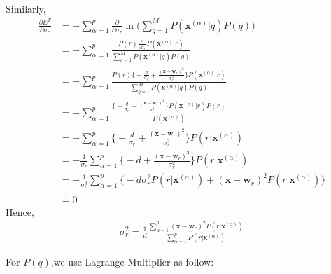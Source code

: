 Similarly,
\begin{align*}
 	\frac{\partial E^T }{\partial \sigma_r} &= - \sum_{\alpha=1}^{p} \frac{\partial }{\partial \sigma_r}  \ln \bigg( \sum_{q=1}^{M} P( \boldsymbol{x}^{(\alpha)} |q) P(q) \bigg) \\
 	&= - \sum_{\alpha=1}^{p} \frac{ P(r)   \frac{\partial }{\partial \sigma_r}  P( \boldsymbol{x}^{(\alpha)} |r)  }{ \sum_{q=1}^{M} P( \boldsymbol{x}^{(\alpha)} |q) P(q) } \\
 	&= - \sum_{\alpha=1}^{p} \frac{ P(r)   \bigg \{ -\frac{d}{\sigma_r}  + \frac{(\boldsymbol{x} - \boldsymbol{w}_r)^2}{\sigma_r^3} \bigg \} P( \boldsymbol{x}^{(\alpha)} | r )  }{ \sum_{q=1}^{M} P( \boldsymbol{x}^{(\alpha)} |q) P(q) } \\
 	&= - \sum_{\alpha=1}^{p} \frac{   \bigg \{ -\frac{d}{\sigma_r}  + \frac{(\boldsymbol{x} - \boldsymbol{w}_r)^2}{\sigma_r^3} \bigg \} P( \boldsymbol{x}^{(\alpha)} | r ) P(r) }{ P( \boldsymbol{x}^{(\alpha)} ) } \\
 	&= - \sum_{\alpha=1}^{p}  \bigg \{ -\frac{d}{\sigma_r}  + \frac{(\boldsymbol{x} - \boldsymbol{w}_r)^2}{\sigma_r^3} \bigg \} P( r |\boldsymbol{x}^{(\alpha)}  ) \\
 	&= - \frac{1}{\sigma_r} \sum_{\alpha=1}^{p}  \bigg \{ -d  + \frac{(\boldsymbol{x} - \boldsymbol{w}_r)^2}{\sigma_r^2} \bigg \} P( r |\boldsymbol{x}^{(\alpha)}  )  \\
 	 	&= - \frac{1}{\sigma_r^3} \sum_{\alpha=1}^{p}  \bigg \{  -d \sigma_r^2 P( r |\boldsymbol{x}^{(\alpha)}  ) + (\boldsymbol{x} - \boldsymbol{w}_r)^2 P( r |\boldsymbol{x}^{(\alpha)}  )  \bigg \}  \\
 	&\stackrel{!}{=} 0
 \end{align*}
 Hence,
 \begin{align*}
 	\sigma_r^2 = \frac{1}{d} \frac{  \sum_{\alpha=1}^{p}  (\boldsymbol{x} - \boldsymbol{w}_r)^2 P( r |\boldsymbol{x}^{(\alpha)}  )   } { \sum_{\alpha=1}^{p}  P( r |\boldsymbol{x}^{(\alpha)}  )  } 
 \end{align*}
 
 For $P(q)$,we use Lagrange Multiplier as follow:
 
